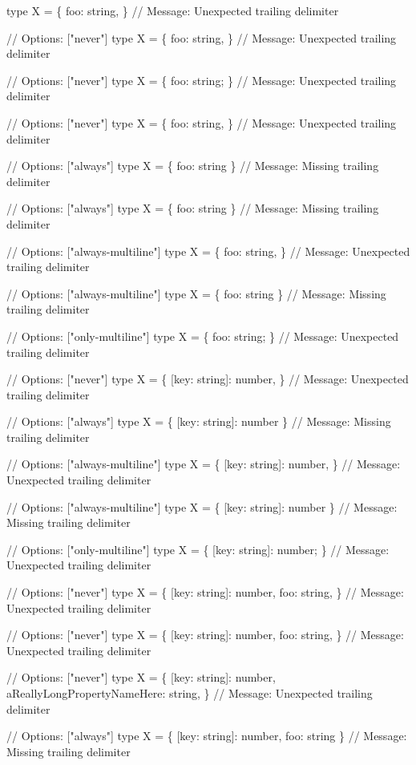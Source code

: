 \begin{DoxyCode}
type X = \{ foo: string, \}
// Message: Unexpected trailing delimiter

// Options: ["never"]
type X = \{ foo: string, \}
// Message: Unexpected trailing delimiter

// Options: ["never"]
type X = \{ foo: string; \}
// Message: Unexpected trailing delimiter

// Options: ["never"]
type X = \{
foo: string,
\}
// Message: Unexpected trailing delimiter

// Options: ["always"]
type X = \{ foo: string \}
// Message: Missing trailing delimiter

// Options: ["always"]
type X = \{
foo: string
\}
// Message: Missing trailing delimiter

// Options: ["always-multiline"]
type X = \{ foo: string, \}
// Message: Unexpected trailing delimiter

// Options: ["always-multiline"]
type X = \{
foo: string
\}
// Message: Missing trailing delimiter

// Options: ["only-multiline"]
type X = \{ foo: string; \}
// Message: Unexpected trailing delimiter

// Options: ["never"]
type X = \{ [key: string]: number, \}
// Message: Unexpected trailing delimiter

// Options: ["always"]
type X = \{ [key: string]: number \}
// Message: Missing trailing delimiter

// Options: ["always-multiline"]
type X = \{ [key: string]: number, \}
// Message: Unexpected trailing delimiter

// Options: ["always-multiline"]
type X = \{
[key: string]: number
\}
// Message: Missing trailing delimiter

// Options: ["only-multiline"]
type X = \{ [key: string]: number; \}
// Message: Unexpected trailing delimiter

// Options: ["never"]
type X = \{ [key: string]: number, foo: string, \}
// Message: Unexpected trailing delimiter

// Options: ["never"]
type X = \{
[key: string]: number,
foo: string,
\}
// Message: Unexpected trailing delimiter

// Options: ["never"]
type X = \{
[key: string]: number,
aReallyLongPropertyNameHere: string,
\}
// Message: Unexpected trailing delimiter

// Options: ["always"]
type X = \{ [key: string]: number, foo: string \}
// Message: Missing trailing delimiter


\end{DoxyCode}
